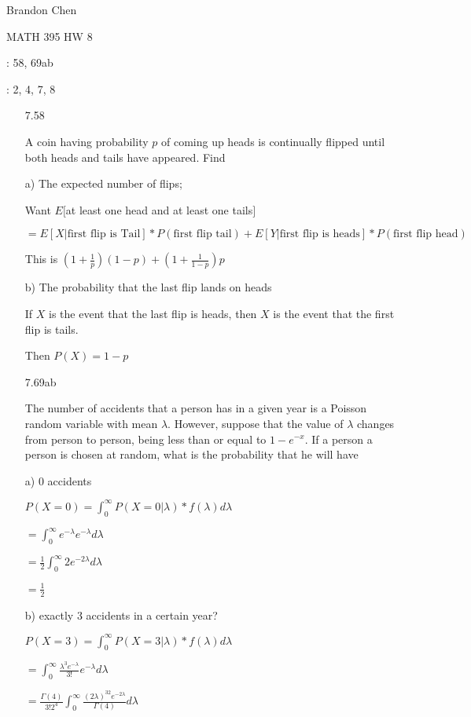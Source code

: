 \documentclass[11pt]{article}
\begin{document}
\noindent Brandon Chen

\noindent MATH 395 HW 8

: 58, 69ab

: 2, 4, 7, 8

\begin{itemize}

	\item[7.58]

		A coin having probability $p$ of coming up heads is
		continually flipped until both heads and tails have 
		appeared. Find

		a) The expected number of flips;

		Want $E[$at least one head and at least one tails$]$

		$=E[X|\text{first flip is Tail}]
		*P(\text{first flip tail})
		+ E[Y|\text{first flip is heads}]
		*P(\text{first flip head})$

		This is $(1 + \frac{1}{p})(1-p) + (1 + \frac{1}{1-p})p$

		b) The probability that the last flip lands on heads

		If $X$ is the event that the last flip is heads, 
		then $X$ is the event that the first flip is tails.

		Then $P(X) = 1- p$

	\item[7.69ab]

		The number of accidents that a person has in a given year 
		is a Poisson random variable with mean $\lambda$. 
		However, suppose that the value of $\lambda$ changes 
		from person to person, being less than or equal to 
		$1 - e^{-x}$. If a person a person is chosen at random,
		what is the probability that he will have

		a) 0 accidents

		$P(X = 0) = \int_0^{\infty} P(X=0|\lambda)
		*f(\lambda)d\lambda$

		$=\int_0^{\infty} e^{-\lambda} e^{-\lambda} d\lambda$

		$=\frac{1}{2} \int_0^{\infty} 2e^{-2\lambda} d\lambda$

		$=\frac{1}{2}$

		b) exactly 3 accidents in a certain year?

		$P(X=3) = \int_0^{\infty} P(X=3|\lambda)
		*f(\lambda)d\lambda$

		$=\int_0^{\infty} \frac{\lambda^3e^{-\lambda}}{3!}
		e^{-\lambda} d\lambda$

		$= \frac{\Gamma(4)}{3!2^4} \int_0^{\infty}
		\frac{(2\lambda)^32e^{-2\lambda}}{\Gamma(4)}d\lambda$


\end{itemize}
\end{document}
